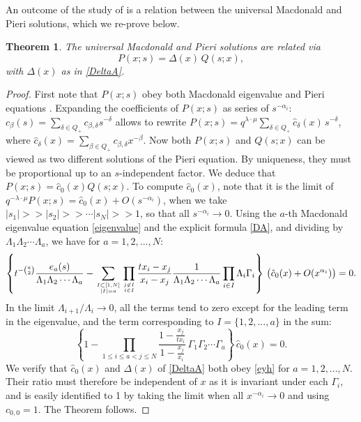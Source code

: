 \documentclass[12pt]{amsart}
\newtheorem{thm}{Theorem}[section]
\newcommand{\al}{{\alpha}}
\newcommand{\lL}{{\Lambda}}
\numberwithin{equation}{section}
\begin{document}
An outcome of the study of \cite{ShiraishiNoumi} is a relation between the universal Macdonald and Pieri solutions, which we re-prove below.
\begin{thm}\label{macpiedelta} The universal Macdonald and Pieri solutions are related via
$$P(x;s)=\Delta(x)\, Q(s;x),$$
with $\Delta(x)$ as in \eqref{DeltaA}. 
\end{thm}
\begin{proof}
First note that $P(x;s)$ obey both Macdonald eigenvalue and Pieri equations \cite{Cherednik95,Chalykh}. 
Expanding the coefficients of $P(x;s)$ as series of $s^{-\al_i}$: $c_\beta(s)=\sum_{\delta \in Q_+} c_{\beta,\delta}s^{-\delta}$ allows to rewrite
$P(x;s)=q^{\lambda\cdot \mu}\sum_{\delta  \in Q_+} \hat c_\delta(x)\, s^{-\delta}$, where $\hat c_\delta(x)=\sum_{\beta \in Q_+}c_{\beta,\delta}x^{-\beta}$.
Now both $P(x;s)$ and $Q(s;x)$ can be viewed as two different solutions of the Pieri equation. By uniqueness, they must be proportional up to an $s$-independent factor. We deduce that $P(x;s)=\hat c_0(x) Q(s;x)$. To compute $\hat c_0(x)$, note that it is the limit of 
$q^{-\lambda\cdot \mu}P(x;s)=\hat c_0(x)+O(s^{-\al_i})$, when we take $|s_1|>>|s_2|>>\cdots |s_N|>>1$, so that all $s^{-\al_i}\to 0$. Using the $a$-th Macdonald eigenvalue equation \eqref{eigenvalue} and the explicit formula \eqref{DA}, and dividing by $\lL_1\lL_2\cdots \lL_a$, we have for $a=1,2,...,N$:
$$\left\{t^{-{a\choose 2}}\frac{e_a(s)}{\lL_1\lL_2\cdots \lL_a}-\sum_{I\subset [1,N]\atop |I|=a} \prod_{j\not\in I\atop i\in I} \frac{t x_i-x_j}{x_i-x_j} \frac{1}{\lL_1\lL_2\cdots \lL_a}\prod_{i\in I} \lL_i \Gamma_i\right\}\, \big(\hat c_0(x)+O(x^{\al_i})\big)=0.$$
In the limit $\lL_{i+1}/\lL_i\to 0$, all the terms tend to zero except for the leading term in the eigenvalue, and the term corresponding to $I=\{1,2,...,a\}$ in the sum:
\begin{equation}\label{eyh} \left\{1-\prod_{1\leq i\leq a<j\leq N} \frac{1-\frac{x_j}{t x_i}}{1-\frac{x_j}{x_i}} \,
\Gamma_1\Gamma_2\cdots \Gamma_a\right\}\,\hat c_0(x)=0.
\end{equation}
We verify that $\hat c_0(x)$ and $\Delta(x)$ of \eqref{DeltaA} both obey \eqref{eyh} for $a=1,2,...,N$. 
Their ratio must therefore be independent of $x$ as it is invariant under each $\Gamma_i$,
and is easily identified to 1 by taking the limit when all $x^{-\al_i}\to 0$ and using $c_{0,0}=1$. The Theorem follows.
\end{proof}
\end{document}
